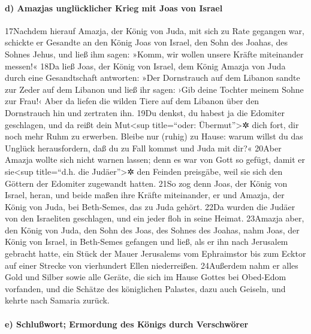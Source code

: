 \hypertarget{d-amazjas-ungluxfccklicher-krieg-mit-joas-von-israel}{%
\paragraph{d) Amazjas unglücklicher Krieg mit Joas von
Israel}\label{d-amazjas-ungluxfccklicher-krieg-mit-joas-von-israel}}

17Nachdem hierauf Amazja, der König von Juda, mit sich zu Rate gegangen
war, schickte er Gesandte an den König Joas von Israel, den Sohn des
Joahas, des Sohnes Jehus, und ließ ihm sagen: »Komm, wir wollen unsere
Kräfte miteinander messen!« 18Da ließ Joas, der König von Israel, dem
König Amazja von Juda durch eine Gesandtschaft antworten: »Der
Dornstrauch auf dem Libanon sandte zur Zeder auf dem Libanon und ließ
ihr sagen: ›Gib deine Tochter meinem Sohne zur Frau!‹ Aber da liefen die
wilden Tiere auf dem Libanon über den Dornstrauch hin und zertraten ihn.
19Du denkst, du habest ja die Edomiter geschlagen, und da reißt dein
Mut\textless sup title=``oder: Übermut''\textgreater✲ dich fort, dir
noch mehr Ruhm zu erwerben. Bleibe nur (ruhig) zu Hause: warum willst du
das Unglück herausfordern, daß du zu Fall kommst und Juda mit dir?«
20Aber Amazja wollte sich nicht warnen lassen; denn es war von Gott so
gefügt, damit er sie\textless sup title=``d.h. die Judäer''\textgreater✲
den Feinden preisgäbe, weil sie sich den Göttern der Edomiter zugewandt
hatten. 21So zog denn Joas, der König von Israel, heran, und beide maßen
ihre Kräfte miteinander, er und Amazja, der König von Juda, bei
Beth-Semes, das zu Juda gehört. 22Da wurden die Judäer von den
Israeliten geschlagen, und ein jeder floh in seine Heimat. 23Amazja
aber, den König von Juda, den Sohn des Joas, des Sohnes des Joahas, nahm
Joas, der König von Israel, in Beth-Semes gefangen und ließ, als er ihn
nach Jerusalem gebracht hatte, ein Stück der Mauer Jerusalems vom
Ephraimstor bis zum Ecktor auf einer Strecke von vierhundert Ellen
niederreißen. 24Außerdem nahm er alles Gold und Silber sowie alle
Geräte, die sich im Hause Gottes bei Obed-Edom vorfanden, und die
Schätze des königlichen Palastes, dazu auch Geiseln, und kehrte nach
Samaria zurück.

\hypertarget{e-schluuxdfwort-ermordung-des-kuxf6nigs-durch-verschwuxf6rer}{%
\paragraph{e) Schlußwort; Ermordung des Königs durch
Verschwörer}\label{e-schluuxdfwort-ermordung-des-kuxf6nigs-durch-verschwuxf6rer}}

